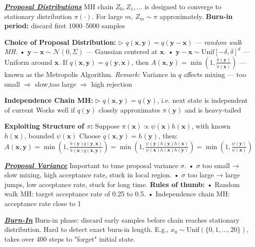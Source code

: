 \documentclass[10pt]{article}
\newcommand{\bulletPoint}[1]{\ul{\textit{\textbf{#1}}}}
\begin{document}
\begin{multicols*}{2}
\bulletPoint{Proposal Distributions}\quad
MH chain $Z_0, Z_1, \dots$ is designed to converge to stationary distribution $\pi(\cdot)$.   
For large $m$, $Z_m \sim \pi$ approximately.   
\textbf{Burn-in period:} discard first 1000–5000 samples

\textbf{Choice of Proposal Distribution:} 
$\triangleright$ $q(\mathbf{x}, \mathbf{y}) = q(\mathbf{y} - \mathbf{x})$ — \textit{random walk MH}.   
• $\mathbf{y} - \mathbf{x} \sim \mathcal{N}(0, \Sigma)$ — Gaussian centered at $\mathbf{x}$. \quad  
• $\mathbf{y} - \mathbf{x} \sim \text{Unif}[-\delta, \delta]^d$ — Uniform around $\mathbf{x}$.   \quad
If $q(\mathbf{x}, \mathbf{y}) = q(\mathbf{y}, \mathbf{x})$, then  
$A(\mathbf{x}, \mathbf{y}) = \min\left(1, \frac{\tilde{\pi}(\mathbf{y})}{\tilde{\pi}(\mathbf{x})}\right)$ — known as the Metropolis Algorithm. 
\textit{Remark:} Variance in $q$ affects mixing — too small $\Rightarrow$ slow,\quad too large $\Rightarrow$ high rejection

\textbf{Independence Chain MH:} 
$\triangleright$ $q(\mathbf{x}, \mathbf{y}) = q(\mathbf{y})$, i.e. next state is independent of current  
Works well if $q(\mathbf{y})$ closely approximates $\pi(\mathbf{y})$ and is heavy-tailed

\textbf{Exploiting Structure of $\pi$:} 
Suppose $\pi(\mathbf{x}) \propto \psi(\mathbf{x}) h(\mathbf{x})$, with known $h(\mathbf{x})$, bounded $\psi(\mathbf{x})$  
Choose $q(\mathbf{x}, \mathbf{y}) = h(\mathbf{y})$, then:
$A(\mathbf{x}, \mathbf{y}) = \min\left(1, \frac{\tilde{\pi}(\mathbf{y})q(\mathbf{y}, \mathbf{x})}{\tilde{\pi}(\mathbf{x})q(\mathbf{x}, \mathbf{y})} \right)
= \min\left(1, \frac{\psi(\mathbf{y})h(\mathbf{y})h(\mathbf{x})}{\psi(\mathbf{x})h(\mathbf{x})h(\mathbf{y})} \right)
= \min\left(1, \frac{\psi(\mathbf{y})}{\psi(\mathbf{x})} \right)$


\bulletPoint{Proposal Variance} \quad
Important to tune proposal variance $\sigma$. \quad
• $\sigma$ too small → slow mixing, high acceptance rate, stuck in local region.   
• $\sigma$ too large → large jumps, low acceptance rate, stuck for long time. 
\textbf{Rules of thumb:}  
• Random walk MH: target acceptance rate of 0.25 to 0.5. \quad  
• Independence chain MH: acceptance rate close to 1

\bulletPoint{Burn-In} \quad
Burn-in phase: discard early samples before chain reaches stationary distribution. 
Hard to detect exact burn-in length.  
E.g., $x_0 \sim \text{Unif}(\{0,1,\dots,20\})$, takes over 400 steps to "forget" initial state.


\end{multicols*}
\end{document}
